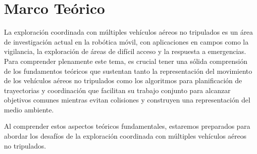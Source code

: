 \chapter{Marco Teórico}

La exploración coordinada con múltiples vehículos aéreos no tripulados es un área de investigación actual en la robótica móvil, con aplicaciones en campos como la vigilancia, la exploración de áreas de difícil acceso y la respuesta a emergencias. Para comprender plenamente este tema, es crucial tener una sólida comprensión de los fundamentos teóricos que sustentan tanto la representación del movimiento de los vehículos aéreos no tripulados como los algoritmos para planificación de trayectorias y coordinación que facilitan su trabajo conjunto para alcanzar objetivos comunes mientras evitan colisiones y construyen una representación del medio ambiente.




Al comprender estos aspectos teóricos fundamentales, estaremos preparados para abordar los desafíos de la exploración coordinada con múltiples vehículos aéreos no tripulados.


